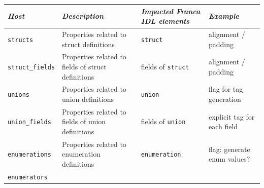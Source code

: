 \documentclass[a4paper,10pt]{scrreprt}
\newlength{\XdocTEffectiveWidth}
\begin{document}
\begin{table}
\setlength{\XdocTEffectiveWidth}{\textwidth}
\addtolength{\XdocTEffectiveWidth}{-8.0\tabcolsep}
\noindent\begin{tabular}{p{0.13\XdocTEffectiveWidth}p{0.38\XdocTEffectiveWidth}p{0.25\XdocTEffectiveWidth}p{0.25\XdocTEffectiveWidth}}
\toprule
\textit{Host}

 & \textit{Description}

 & \textit{Impacted Franca IDL elements}

 & \textit{Example}

\\
\midrule
\protect\lstinline[language=FDeploy]�structs�

 & Properties related to struct definitions

 & \protect\lstinline[language=Franca]�struct�

 & alignment / padding

\\
\protect\lstinline[language=FDeploy]�struct_fields�

 & Properties related to fields of struct definitions

 & fields of \protect\lstinline[language=Franca]�struct�

 & alignment / padding

\\
\protect\lstinline[language=FDeploy]�unions�

 & Properties related to union definitions

 & \protect\lstinline[language=Franca]�union�

 & flag for tag generation

\\
\protect\lstinline[language=FDeploy]�union_fields�

 & Properties related to fields of union definitions

 & fields of \protect\lstinline[language=Franca]�union�

 & explicit tag for each field

\\
\protect\lstinline[language=FDeploy]�enumerations�

 & Properties related to enumeration definitions

 & \protect\lstinline[language=Franca]�enumeration�

 & flag: generate enum values?

\\
\protect\lstinline[language=FDeploy]�enumerators�


\end{tabular}
\end{table}
\end{document}
